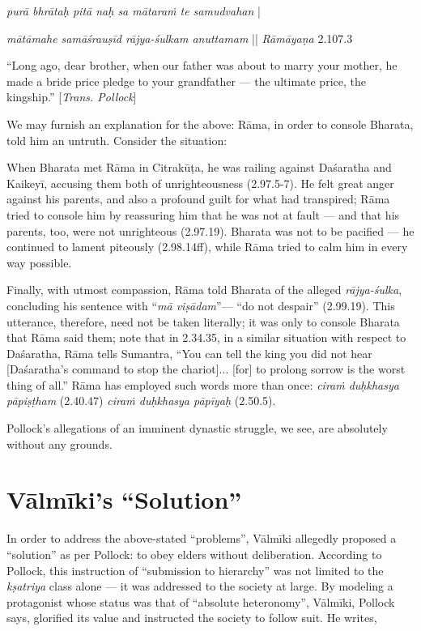 \begin{myquote}
{{\sl purā bhrātaḥ pitā naḥ sa mātaraṁ te samudvahan}} |

{\sl mātāmahe samāśrauṣīd rājya-śulkam anuttamam} || {\sl Rāmāyaṇa} 2.107.3
\end{myquote}

\begin{myquote}
“Long ago, dear brother, when our father was about to marry your mother, he made a bride price pledge to your grandfather --- the ultimate price, the kingship.” [{\sl Trans. Pollock}]
\end{myquote}

We may furnish an explanation for the above: Rāma, in order to console Bharata, told him an untruth. Consider the situation:

When Bharata met Rāma in Citrakūṭa, he was railing against Daśaratha and Kaikeyī, accusing them both of unrighteousness (2.97.5-7). He felt great anger against his parents, and also a profound guilt for what had transpired; Rāma tried to console him by reassuring him that he was not at fault --- and that his parents, too, were not unrighteous (2.97.19). Bharata was not to be pacified --- he continued to lament piteously (2.98.14ff), while Rāma tried to calm him in every way possible. 

Finally, with utmost compassion, Rāma told Bharata of the alleged {\sl rājya-śulka}, concluding his sentence with “{\sl mā viṣādam}”--- “do not despair” (2.99.19). This utterance, therefore, need not be taken literally; it was only to console Bharata that Rāma said them; note that in 2.34.35, in a similar situation with respect to Daśaratha, Rāma tells Sumantra, “You can tell the king you did not hear [Daśaratha’s command to stop the chariot]... [for] to prolong sorrow is the worst thing of all.” Rāma has employed such words more than once: {\sl ciraṁ duḥkhasya pāpiṣṭham} (2.40.47) {\sl ciraṁ duḥkhasya pāpīyaḥ} (2.50.5). 

Pollock’s allegations of an imminent dynastic struggle, we see, are absolutely without any grounds. 

\section{Vālmīki’s “Solution”}\label{sec1.3}

In order to address the above-stated “problems”, Vālmīki allegedly proposed a “solution” as per Pollock: to obey elders without deliberation. According to Pollock, this instruction of “submission to hierarchy” was not limited to the {\sl kṣatriya} class alone --- it was addressed to the society at large. By modeling a protagonist whose status was that of “absolute heteronomy”, Vālmīki, Pollock says, glorified its value and instructed the society to follow suit. He writes, 

